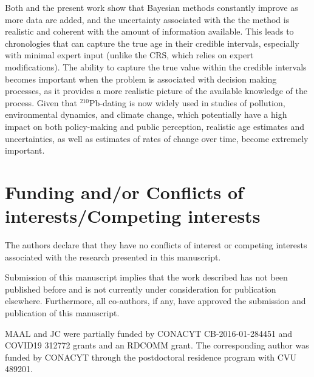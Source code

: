 \documentclass [10pt] {article}
\begin{document}
Both \citet{Blaauw2018} and the present work show that Bayesian methods constantly improve as more data are added, and the uncertainty associated with the the method is realistic and coherent with the amount of information available. 
This leads to chronologies that can capture the true age in their credible intervals, especially with minimal expert input (unlike the CRS, which relies on expert modifications). 
The ability to capture the true value within the credible intervals becomes important when the problem is associated with decision making processes, as it provides a more realistic picture of the available knowledge of the process. 
Given that $^{210}$Pb-dating is now widely used in studies of pollution, environmental dynamics, and climate change, which potentially have a high impact on both policy-making and public perception, realistic age estimates and uncertainties, as well as estimates of rates of change over time, become extremely important.


\section{Funding and/or Conflicts of interests/Competing interests }

The authors declare that they have no conflicts of interest or competing interests associated with the research presented in this manuscript.

Submission of this manuscript implies that the work described has not been published before and is not currently under consideration for publication elsewhere. Furthermore, all co-authors, if any, have approved the submission and publication of this manuscript. 


MAAL and JC were partially funded by CONACYT CB-2016-01-284451 and COVID19 312772 grants and an RDCOMM grant.
The corresponding author was funded by CONACYT through the postdoctoral residence program with CVU  489201.









\newpage


\end{document}
